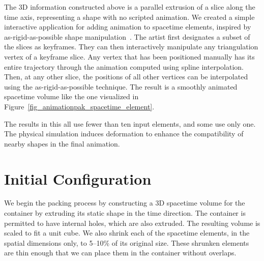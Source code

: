 The 3D information constructed above is a parallel extrusion of a 
slice along the time axis, representing a shape with no scripted animation.
We created a simple interactive application for adding animation to
spacetime elements, inspired by as-rigid-as-possible shape
manipulation~\cite{Igarashi2005}.  The artist first designates a subset
of the slices as keyframes.  They can then interactively manipulate
any triangulation vertex of a keyframe slice.  Any vertex that has
been positioned manually has its entire trajectory through the animation
computed using spline interpolation.  Then, at any other slice, the positions
of all other vertices can be interpolated using the as-rigid-as-possible
technique.  The result is a smoothly animated spacetime volume like the one
visualized in Figure~\ref{fig_animationpak_spacetime_element}.

  The results in this  all use
fewer than ten input elements, and some use only one.
The physical simulation induces deformation to enhance 
the compatibility of nearby shapes in the final animation.

\section{Initial Configuration}
\label{animationpak_initial_configuration}



We begin the packing process by constructing a 3D spacetime volume for
the container by extruding its static shape in
the time direction.  The container is 
permitted to have internal holes, which are also extruded.  
The resulting volume is scaled to fit a unit cube.
We also shrink each of the spacetime elements, in the spatial dimensions
only, to 5--10\% of its original size.  These shrunken elements are 
thin enough that we can place them in the container without overlaps.


